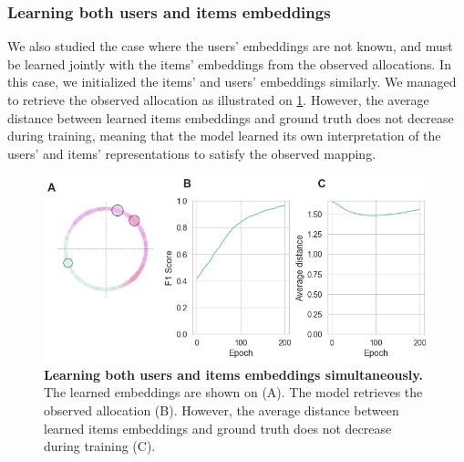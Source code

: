 \subsubsection*{Learning both users and items embeddings}

We also studied the case where the users' embeddings are not known, and must be
learned jointly with the items' embeddings from the observed allocations. In
this case, we initialized the items' and users' embeddings similarly. We managed
to retrieve the observed allocation as illustrated on
\cref{fig:experiment_learn_users_embeddings}. However, the average distance
between learned items embeddings and ground truth does not decrease during
training, meaning that the model learned its own interpretation of the users'
and items' representations to satisfy the observed mapping.

\begin{figure}[h]
    \centering
    \includegraphics[width=.9\columnwidth]{images/simca/experiment_learn_both_embeddings.png}
    \caption{ \textbf{Learning both users and items embeddings simultaneously.}
        The learned embeddings are shown on (A). The model retrieves the
        observed allocation (B). However, the average distance between learned
        items embeddings and ground truth does not decrease during training (C).
    }
    \label{fig:experiment_learn_users_embeddings}
\end{figure}
